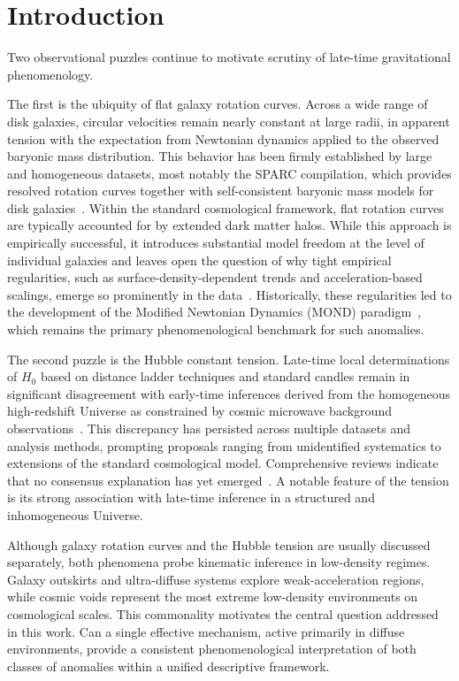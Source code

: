\section{Introduction}
  \label{sec:introduction}

  Two observational puzzles continue to motivate scrutiny of late-time
  gravitational phenomenology.

  The first is the ubiquity of flat galaxy rotation curves.
  Across a wide range of disk galaxies, circular velocities remain nearly
  constant at large radii, in apparent tension with the expectation from
  Newtonian dynamics applied to the observed baryonic mass distribution.
  This behavior has been firmly established by large and homogeneous datasets,
  most notably the SPARC compilation, which provides resolved rotation curves
  together with self-consistent baryonic mass models for disk galaxies~\cite{Lelli2016SPARC}.
  Within the standard cosmological framework, flat rotation curves are typically
  accounted for by extended dark matter halos.
  While this approach is empirically successful, it introduces substantial model
  freedom at the level of individual galaxies and leaves open the question of why
  tight empirical regularities, such as surface-density-dependent trends and
  acceleration-based scalings, emerge so prominently in the data~\cite{McGaugh2016}.
  Historically, these regularities led to the development of the Modified Newtonian
  Dynamics (MOND) paradigm~\cite{Milgrom1983,Bekenstein1984}, which remains
  the primary phenomenological benchmark for such anomalies.

  The second puzzle is the Hubble constant tension.
  Late-time local determinations of $H_0$ based on distance ladder techniques and
  standard candles remain in significant disagreement with early-time inferences
  derived from the homogeneous high-redshift Universe as constrained by cosmic
  microwave background observations~\cite{Riess2022SH0ES,Planck2020}.
  This discrepancy has persisted across multiple datasets and analysis methods,
  prompting proposals ranging from unidentified systematics to extensions of the
  standard cosmological model.
  Comprehensive reviews indicate that no consensus explanation has yet emerged~\cite{Verde2019Review}.
  A notable feature of the tension is its strong association with late-time
  inference in a structured and inhomogeneous Universe.

  Although galaxy rotation curves and the Hubble tension are usually discussed
  separately, both phenomena probe kinematic inference in low-density regimes.
  Galaxy outskirts and ultra-diffuse systems explore weak-acceleration regions,
  while cosmic voids represent the most extreme low-density environments on
  cosmological scales.
  This commonality motivates the central question addressed in this work.
  Can a single effective mechanism, active primarily in diffuse environments,
  provide a consistent phenomenological interpretation of both classes of
  anomalies within a unified descriptive framework.

